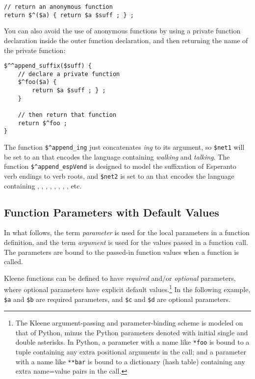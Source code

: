 \begin{Verbatim}
// return an anonymous function
return $^($a) { return $a $suff ; } ;
\end{Verbatim}

\noindent
You can also avoid the use of anonymous functions by using a private function declaration inside
the outer function declaration, and then returning the name of the private function:

\begin{Verbatim}
$^^append_suffix($suff) {
    // declare a private function
    $^foo($a) {
        return $a $suff ; } ;
    }

    // then return that function
    return $^foo ;
}
\end{Verbatim}

The function \verb!$^append_ing! just concatenates \emph{ing} to
its \fsm{} argument, so \verb!$net1! will be set to an \fsm{} that
encodes the language containing \emph{walking} and \emph{talking}.
The function \verb!$^append_espVend! is designed to model the
suffixation of Esperanto verb endings to verb roots, and
\verb!$net2! is set to an \fsm{} that encodes the language
containing , , ,
, , , , , etc.


\subsection{Function Parameters with Default Values}

In what follows, the term \emph{parameter} is used for the local
parameters in a function definition, and the term \emph{argument} is
used for the values passed in a function call.  The parameters are bound to the passed-in 
function values when a function
is called.

Kleene functions can be defined to have \emph{required} and/or \emph{optional}
parameters, where optional parameters have explicit default
values.\cprotect\footnote{The Kleene argument-passing and parameter-binding scheme
is modeled on that of Python, minus the Python parameters denoted with
initial single and double asterisks.  In Python, a parameter with a name like
\verb!*foo! is bound to a tuple containing any extra positional arguments in
the call; and
a parameter with a name like \verb!**bar! is bound to a dictionary (hash table) containing any
extra name=value pairs in the call.} In
the following example, \verb!$a! and \verb!$b! are required parameters, and \verb!$c! and
\verb!$d! are optional parameters.

